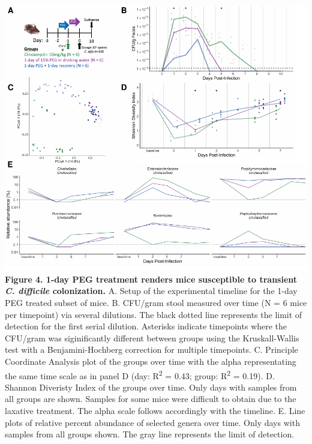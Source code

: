 \documentclass[
  11pt,
]{article}
\begin{document}
\includegraphics{figure_4.pdf} \textbf{Figure 4. 1-day PEG treatment
renders mice susceptible to transient \emph{C. difficile} colonization.}
A. Setup of the experimental timeline for the 1-day PEG treated subset
of mice. B. CFU/gram stool measured over time (N = 6 mice per timepoint)
via several dilutions. The black dotted line represents the limit of
detection for the first serial dilution. Asterisks indicate timepoints
where the CFU/gram was siginificantly different between groups using the
Kruskall-Wallis test with a Benjamini-Hochberg correction for multiple
timepoints. C. Principle Coordinate Analysis plot of the groups over
time with the alpha representating the same time scale as in panel D
(day: R\textsuperscript{2} = 0.43; group: R\textsuperscript{2} = 0.19).
D. Shannon Diveristy Index of the groups over time. Only days with
samples from all groups are shown. Samples for some mice were difficult
to obtain due to the laxative treatment. The alpha scale follows
accordingly with the timeline. E. Line plots of relative percent
abundance of selected genera over time. Only days with samples from all
groups shown. The gray line represents the limit of detection.
\end{document}
